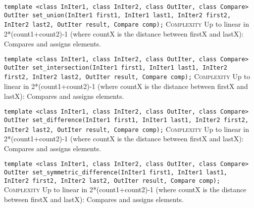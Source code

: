 \noindent{}\hspace*{0.25em}\lstinline[basicstyle=\ttfamily\color{corange}]{template <class InIter1, class InIter2, class OutIter, class Compare> OutIter set_union(InIter1 first1, InIter1 last1, InIter2 first2, InIter2 last2, OutIter result, Compare comp);} \textsc{Complexity} Up to linear in 2*(count1+count2)-1 (where countX is the distance between firstX and lastX): Compares and assigns elements.\\\vspace{-0.6em}

\noindent{}\hspace*{0.25em}\lstinline[basicstyle=\ttfamily\color{corange}]{template <class InIter1, class InIter2, class OutIter, class Compare> OutIter set_intersection(InIter1 first1, InIter1 last1, InIter2 first2, InIter2 last2, OutIter result, Compare comp);} \textsc{Complexity} Up to linear in 2*(count1+count2)-1 (where countX is the distance between firstX and lastX): Compares and assigns elements.\\\vspace{-0.6em}

\noindent{}\hspace*{0.25em}\lstinline[basicstyle=\ttfamily\color{corange}]{template <class InIter1, class InIter2, class OutIter, class Compare> OutIter set_difference(InIter1 first1, InIter1 last1, InIter2 first2, InIter2 last2, OutIter result, Compare comp);} \textsc{Complexity} Up to linear in 2*(count1+count2)-1 (where countX is the distance between firstX and lastX): Compares and assigns elements.\\\vspace{-0.6em}

\noindent{}\hspace*{0.25em}\lstinline[basicstyle=\ttfamily\color{corange}]{template <class InIter1, class InIter2, class OutIter, class Compare> OutIter set_symmetric_difference(InIter1 first1, InIter1 last1, InIter2 first2, InIter2 last2, OutIter result, Compare comp);} \textsc{Complexity} Up to linear in 2*(count1+count2)-1 (where countX is the distance between firstX and lastX): Compares and assigns elements.\\\vspace{-0.6em}

